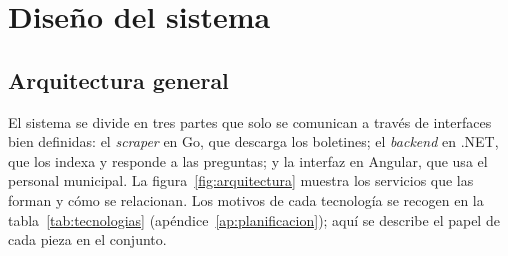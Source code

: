 \chapter{Diseño del sistema}
\label{cap:diseno}

\section{Arquitectura general}
\label{sec:arquitectura}

El sistema se divide en tres partes que solo se comunican a través de interfaces bien definidas: el \emph{scraper} en Go, que descarga los boletines; el \emph{backend} en .NET, que los indexa y responde a las preguntas; y la interfaz en Angular, que usa el personal municipal. La figura~\ref{fig:arquitectura} muestra los servicios que las forman y cómo se relacionan. Los motivos de cada tecnología se recogen en la tabla~\ref{tab:tecnologias} (apéndice~\ref{ap:planificacion}); aquí se describe el papel de cada pieza en el conjunto.

